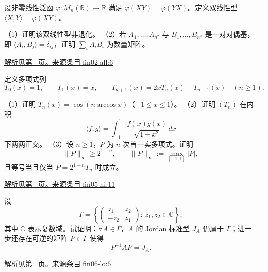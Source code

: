 \documentclass[UTF8,12pt,a4paper,fontset=fandol]{ctexart}
\begin{document}
\begin{example}\label{ex:fin02-all:6}

设非零线性泛函 $\varphi:M_n(\mathbb R)\to\mathbb R$ 满足
$\varphi(XY)=\varphi(YX)$。定义双线性型
$\langle X,Y\rangle=\varphi(XY)$。

（1）证明该双线性型非退化。
（2）若 $A_1,\ldots,A_{n^2}$ 与 $B_1,\ldots,B_{n^2}$ 是一对对偶基，即 $\langle A_i,B_j\rangle=\delta_{ij}$，证明 $\sum_i A_iB_i$ 为数量矩阵。

\par\hyperref[ans:fin02-all:6]{解析见第~\pageref{ans:fin02-all:6} 页。}\quad\href{https://github.com/lzxcr/cmc-mathematics/blob/64916fa1fdbc3e444a652eca204d5669058ee321/src/problems/finals/02/06.md}{来源条目 fin02-all:6}

\end{example}

\begin{example}\label{ex:fin05-hi:11}

定义多项式列
\[
T_0(x)=1,\qquad T_1(x)=x,\qquad
T_{n+1}(x)=2xT_n(x)-T_{n-1}(x)\quad(n\ge1).
\]

（1）证明 $T_n(x)=\cos(n\arccos x)$（$-1\le x\le1$）。
（2）证明 $(T_n)$ 在内积
\[
\langle f,g\rangle=\int_{-1}^1\frac{f(x)g(x)}{\sqrt{1-x^2}}\,dx
\]
下两两正交。
（3）设 $n\ge1$，$P$ 为 $n$ 次首一实多项式。证明
\[
\|P\|_\infty\ge2^{1-n},\qquad
\|P\|_\infty:=\max_{[-1,1]}|P|,
\]
且等号当且仅当 $P=2^{1-n}T_n$ 时成立。

\par\hyperref[ans:fin05-hi:11]{解析见第~\pageref{ans:fin05-hi:11} 页。}\quad\href{https://github.com/lzxcr/cmc-mathematics/blob/64916fa1fdbc3e444a652eca204d5669058ee321/src/problems/finals/05/12.md}{来源条目 fin05-hi:11}

\end{example}

\begin{example}\label{ex:fin06-lo:6}

设
\[
\Gamma=\left\{\begin{pmatrix}z_1&z_2\\-\overline{z_2}&\overline{z_1}\end{pmatrix}:\ z_1,z_2\in\mathbb{C}\right\},
\]
其中 $\mathbb{C}$ 表示复数域。试证明：$\forall A\in\Gamma$，$A$ 的 Jordan 标准型 $J_A$ 仍属于 $\Gamma$；进一步还存在可逆的矩阵 $P\in\Gamma$ 使得
\[
P^{-1}AP=J_A .
\]

\par\hyperref[ans:fin06-lo:6]{解析见第~\pageref{ans:fin06-lo:6} 页。}\quad\href{https://github.com/lzxcr/cmc-mathematics/blob/64916fa1fdbc3e444a652eca204d5669058ee321/src/problems/finals/06/06.md}{来源条目 fin06-lo:6}

\end{example}
\end{document}

